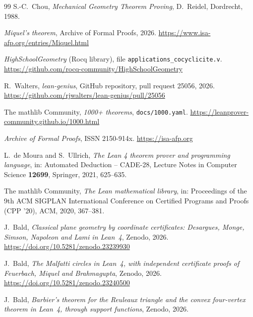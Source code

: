 \begin{thebibliography}{99}
S.-C.~Chou,
\emph{Mechanical Geometry Theorem Proving},
D.~Reidel, Dordrecht, 1988.

\emph{Miquel's theorem}, Archive of Formal Proofs, 2026.
\url{https://www.isa-afp.org/entries/Miquel.html}

\emph{HighSchoolGeometry} (Rocq library), file \texttt{applications\_cocyclicite.v}.
\url{https://github.com/rocq-community/HighSchoolGeometry}

R.~Walters,
\emph{lean-genius}, GitHub repository, pull request 25056, 2026.
\url{https://github.com/rjwalters/lean-genius/pull/25056}

The mathlib Community, \emph{1000+ theorems}, \texttt{docs/1000.yaml}.
\url{https://leanprover-community.github.io/1000.html}

\emph{Archive of Formal Proofs}, ISSN 2150-914x. \url{https://isa-afp.org}

L.~de Moura and S.~Ullrich,
\emph{The Lean 4 theorem prover and programming language},
in: Automated Deduction -- CADE-28, Lecture Notes in Computer Science \textbf{12699}, Springer, 2021, 625--635.

The mathlib Community,
\emph{The Lean mathematical library},
in: Proceedings of the 9th ACM SIGPLAN International Conference on Certified Programs and Proofs (CPP '20), ACM, 2020, 367--381.

J.~Bald,
\emph{Classical plane geometry by coordinate certificates: Desargues, Monge, Simson, Napoleon and Lami in Lean~4},
Zenodo, 2026. \url{https://doi.org/10.5281/zenodo.23239930}

J.~Bald,
\emph{The Malfatti circles in Lean~4, with independent certificate proofs of Feuerbach, Miquel and Brahmagupta},
Zenodo, 2026. \url{https://doi.org/10.5281/zenodo.23240500}

J.~Bald,
\emph{Barbier's theorem for the Reuleaux triangle and the convex four-vertex theorem in Lean~4, through support functions},
Zenodo, 2026. 

\end{thebibliography}
